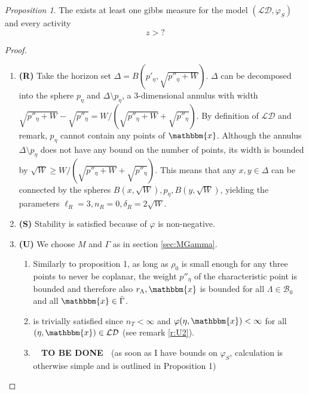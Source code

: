 \documentclass[12pt,a4paper]{article}
\theoremstyle{definition}
\theoremstyle{remark}
\theoremstyle{theorem}
\newtheorem{proposition}{Proposition}
\newcommand{\tbd}{\textbf{{\color{red}~ TO BE DONE ~}}}
\newcommand{\x}{\mathbbm{x}}
\begin{document}
\begin{proposition}
	The exists at least one gibbs measure for the model $(\mathcal {LD},\varphi_S)$ and every activity
	$$z > ?$$
\end{proposition}
\begin{proof}
\begin{enumerate}[]
	\item \textbf{(R)} Take the horizon set $\Delta = B(p'_\eta, \sqrt{p''_\eta + W})$. $\Delta$ can be decomposed into the sphere $p_\eta$ and $\Delta \setminus p_\eta$, a 3-dimensional annulus with width $\sqrt{p''_\eta+W} -\sqrt{p''_\eta}=W/(\sqrt{p''_\eta+W} + \sqrt{p''_\eta})$. By definition of $\mathcal {LD}$ and remark, $p_\eta$  cannot contain any points of $\x$.  Although the annulus $\Delta \setminus p_\eta$ does not have any bound on the number of points, its width is bounded by $\sqrt W \geq  W/(\sqrt{p''_\eta+W} + \sqrt{p''_\eta})$. This means that any $x,y\in \Delta$ can be connected by the spheres $B(x,\sqrt W), p_\eta, B(y,\sqrt W)$, yielding the parameters $\ell_R = 3,n_R=0,\delta_R=2\sqrt W$.
	\item \textbf{(S)} Stability is satisfied because of $\varphi$ is non-negative.
	\item \textbf{(U)} We choose $M$ and $\Gamma$ as in section \ref{sec:MGamma}.
		\begin{enumerate}[(U1)]
			\item {} Similarly to proposition 1, as long as $\rho_0$ is small enough for any three points to never be coplanar, the weight $p''_\eta$ of the characteristic point is bounded and therefore also $r_\Lambda,\x$ is bounded for all $\Lambda \in \mathcal B_0$ and all $\x \in \bar \Gamma$.
			\item is trivially satisfied since $n_T < \infty$ and $\varphi(\eta,\x)<\infty$ for all $(\eta,\x)\in\mathcal {LD}$ (see remark \ref{r:U2}). 
			\item \tbd (as soon as I have bounds on $\varphi_S$, calculation is otherwise simple and is outlined in Proposition 1)
		\end{enumerate}
\end{enumerate}
\end{proof}
\end{document}
